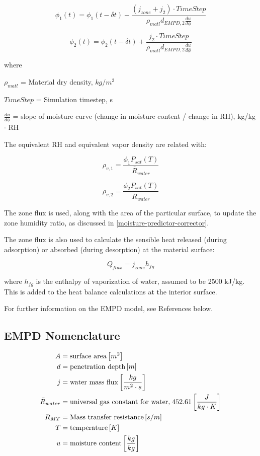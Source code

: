 \begin{equation}
\phi_{1}(t) = \phi_{1}(t-\delta t) - \frac { (j_{zone} + j_{2}) \cdot TimeStep} {\rho_{matl} d_{EMPD,2} \frac {du}{d\phi}}
\end{equation}

\begin{equation}
\phi_{2}(t) = \phi_{2}(t-\delta t) + \frac { j_{2} \cdot TimeStep} {\rho_{matl} d_{EMPD,2} \frac {du}{d\phi}}
\end{equation}

where

$\rho_{matl}$ = Material dry density, $kg/m^3$

$TimeStep$ = Simulation timestep, s

$\frac {du}{d\phi}$ = slope of moisture curve (change in moisture content / change in RH), kg/kg $\cdot$ RH

The equivalent RH and equivalent vapor density are related with:

\begin{equation}
\rho_{v,1} = \frac {\phi_{1} P_{sat}(T)} {\bar R_{water}}
\end{equation}

\begin{equation}
\rho_{v,2} = \frac {\phi_{2} P_{sat}(T)} {\bar R_{water}}
\end{equation}

The zone flux is used, along with the area of the particular surface, to update the zone humidity ratio, as discussed in \ref{moisture-predictor-corrector}.

The zone flux is also used to calculate the sensible heat released (during adsorption) or absorbed (during desorption) at the material surface:

\begin{equation}
Q_{flux} = j_{zone} h_{fg}
\end{equation}

where \(h_{fg}\) is the enthalpy of vaporization of water, assumed to be 2500 kJ/kg. This is added to the heat balance calculations at the interior surface.

For further information on the EMPD model, see References below.

\subsection{EMPD Nomenclature}\label{empd-nomenclature}
\begin{align*}  
  A  &= \text{surface area} \left[m^{2}\right] \\
  d &= \text{penetration depth} \left[m\right] \\
  j &= \text{water mass flux} \left[\frac{kg}{m^{2} \cdot s}\right] \\
  \bar R_{water} &= \text{universal gas constant for water,} \; 452.61 \left[\frac{J}{kg \cdot K}\right]   \\
  R_{MT} &= \text{Mass transfer resistance} \left[s/m\right] \\
  T &= \text{temperature} \left[K\right] \\
  u &= \text{moisture content} \left[\frac{kg}{kg}\right]
\end{align*}

